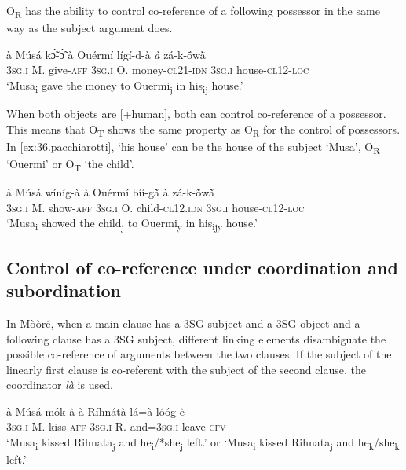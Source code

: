 \documentclass[output=paper]{langsci/langscibook}
\begin{document}
O\textsubscript{R} has the ability to control co-reference of a following possessor in the same way as the subject argument does.

\ea
\label{ex:35.pacchiarotti}
\gll \`{a} M\'{u}s\'{a} kɔ̃́-ɔ̃̀ \`{a} Ouérm\'{i} l\'{i}g\'{i}-d-\`{a} \textit{\`{a}} z\'{a}-k-\'{\~{o}}w\`{\~{a}}  \\
\textsc{3sg.i}  M.  give-\textsc{aff} \textsc{3sg.i} O. money-\textsc{cl21-idn} \textsc{3sg.i}  house-\textsc{cl12-loc}\\
\glt `Musa\textsubscript{i} gave the money to Ouermi\textsubscript{j} in his\textsubscript{ij} house.'
\z

When both objects are [+human], both can control co-reference of a possessor. This means that O\textsubscript{T} shows the same property as O\textsubscript{R} for the control of possessors. In \ref{ex:36.pacchiarotti}, `his house' can be the house of the subject `Musa', O\textsubscript{R} `Ouermi' or O\textsubscript{T} `the child'.

\ea
\label{ex:36.pacchiarotti}
\gll \`{a} M\'{u}s\'{a} w\'{i}n\'{i}g-\`{a} \`{a} Ouérm\'{i} b\'{i}\'{i}-g\`{\~{a}} \`{a} z\'{a}-k-\'{\~{o}}w\`{\~{a}}  \\
\textsc{3sg.i}  M.  show-\textsc{aff} \textsc{3sg.i} O. child\textsc{-cl12.idn} \textsc{3sg.i} house-\textsc{cl12-loc}\\
\glt `Musa\textsubscript{i} showed the child\textsubscript{j} to Ouermi\textsubscript{y} in his\textsubscript{ijy} house.' 
\z

\subsection{Control of co-reference under coordination and subordination}\label{§5.3:control.pacchiarotti}

In Mòòré, when a main clause has a 3SG subject and a 3SG object and a following clause has a 3SG subject, different linking elements disambiguate the possible co-reference of arguments between the two clauses. If the subject of the linearly first clause is co-referent with the subject of the second clause, the coordinator \textit{l\`{a}} is used.

\ea
\label{ex:37.pacchiarotti}
\gll \`{a}    M\'{u}s\'{a}  m\'{o}k-\`{a}    \`{a}    R\'{i}hn\'{a}t\`{a}  l\'{a}=\`{a}      l\'{o}\'{o}g-\`{e}\\
\textsc{3sg.i  }  M.  kiss-\textsc{aff}  \textsc{3sg.i} R.    and=\textsc{3sg.i  }  leave-\textsc{cfv}\\
\glt `Musa\textsubscript{i} kissed Rihnata\textsubscript{j} and he\textsubscript{i}/*she\textsubscript{j} left.' or `Musa\textsubscript{i} kissed Rihnata\textsubscript{j} and he\textsubscript{k}/she\textsubscript{k} left.'
\z
\end{document}
